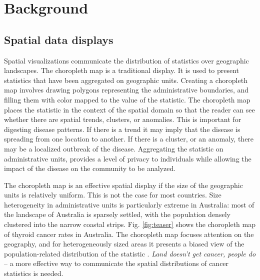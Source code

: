 \documentclass[journal]{vgtc}                     %
\begin{document}
\hypertarget{background}{%
\section{Background}\label{background}}

\hypertarget{spatial-data-displays}{%
\subsection{Spatial data displays}\label{spatial-data-displays}}

Spatial visualizations communicate the distribution of statistics over geographic landscapes. The choropleth map \cite{EI,BCM} is a traditional display. It is used to present statistics that have been aggregated on geographic units. Creating a choropleth map involves drawing polygons representing the administrative boundaries, and filling them with color mapped to the value of the statistic. The choropleth map places the statistic in the context of the spatial domain so that the reader can see whether there are spatial trends, clusters, or anomalies. This is important for digesting disease patterns. If there is a trend it may imply that the disease is spreading from one location to another. If there is a cluster, or an anomaly, there may be a localized outbreak of the disease. Aggregating the statistic on administrative units, provides a level of privacy to individuals while allowing the impact of the disease on the community to be analyzed.





The choropleth map is an effective spatial display if the size of the geographic units is relatively uniform. This is not the case for most countries. Size heterogeneity in administrative units is particularly extreme in Australia: most of the landscape of Australia is sparsely settled, with the population densely clustered into the narrow coastal strips. Fig. \ref{fig:teaser} shows the choropleth map of thyroid cancer rates in Australia. The choropleth map focuses attention on the geography, and for heterogeneously sized areas it presents a biased view of the population-related distribution of the statistic \cite{CBATCC}. \emph{Land doesn't get cancer, people do} -- a more effective way to communicate the spatial distributions of cancer statistics is needed.
\end{document}
